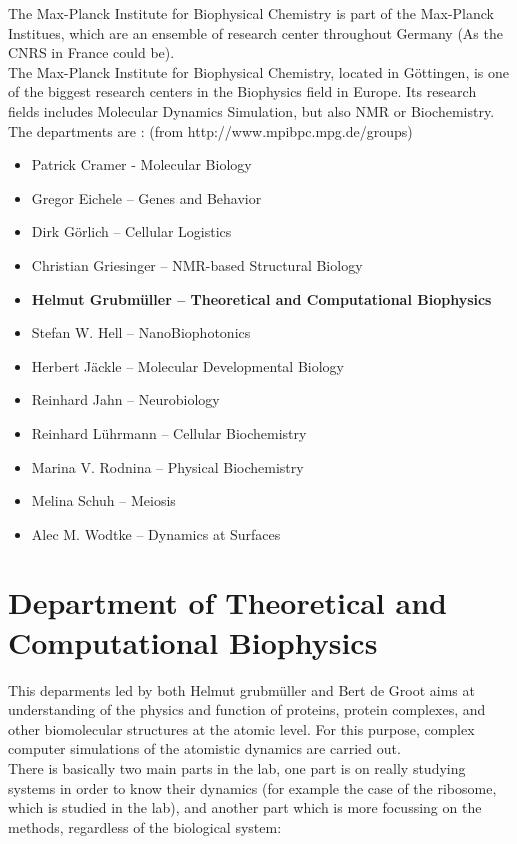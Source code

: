 \documentclass[11pt,twoside,a4paper]{report}
\begin{document}
The Max-Planck Institute for Biophysical Chemistry is part of the Max-Planck Institues, which are an ensemble of research center throughout Germany (As the CNRS in France could be).\\

The Max-Planck Institute for Biophysical Chemistry, located in Göttingen, is one of the biggest research centers in the Biophysics field in Europe. Its research fields includes Molecular Dynamics Simulation, but also NMR or Biochemistry.\\
The departments are : (from http://www.mpibpc.mpg.de/groups)
\begin{itemize}
\item Patrick Cramer - Molecular Biology
\item Gregor Eichele – Genes and Behavior
\item Dirk Görlich – Cellular Logistics
\item Christian Griesinger – NMR-based Structural  Biology
\item \textbf{Helmut Grubmüller – Theoretical and Computational Biophysics}
\item Stefan W. Hell – NanoBiophotonics
\item Herbert Jäckle – Molecular Developmental Biology
\item Reinhard Jahn – Neurobiology
\item Reinhard Lührmann – Cellular Biochemistry
\item Marina V. Rodnina – Physical Biochemistry
\item Melina Schuh – Meiosis 
\item Alec M. Wodtke – Dynamics at Surfaces
\end{itemize}

\section*{Department of Theoretical and Computational Biophysics}

This deparments led by both Helmut grubmüller and Bert de Groot aims at understanding of the physics and function of proteins, protein complexes, and other biomolecular structures at the atomic level. For this purpose, complex computer simulations of the atomistic dynamics are carried out.\\

There is basically two main parts in the lab, one part is on really studying systems in order to know their dynamics (for example the case of the ribosome, which is studied in the lab), and another part which is more focussing on the methods, regardless of the biological system:
\end{document}
